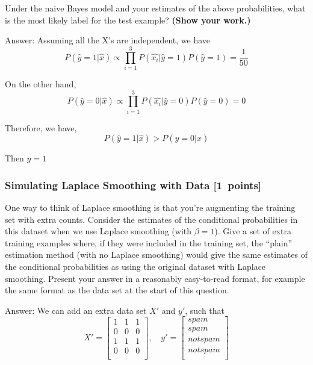 \documentclass{article}
\newcommand{\blu}[1]{{\textcolor{blu}{#1}}}
\newenvironment{answer}{\par\begingroup\color{gre}Answer: }{\endgroup}
\let\ask\blu
\newcommand\pts[1]{\textcolor{pointscolour}{[#1~points]}}
\begin{document}
    \ask{Under the naive Bayes model and your estimates of the above probabilities, what is the most likely label for the test example? \textbf{(Show your work.)}}
    \begin{answer}
        Assuming all the X's are independent, we have
        \begin{equation}
            P(\hat{y} = 1 | \hat{x}) \propto \prod_{i = 1}^3 P(\hat{x_{i}}| \hat{y} = 1) P(\hat{y} = 1) = \frac{1}{50}
        \end{equation}

        On the other hand,
        \begin{equation}
            P(\hat{y} = 0 | \hat{x})  \propto \prod_{i = 1}^3 P(\hat{x_{i}}| \hat{y} = 0) P(\hat{y} = 0)= 0
        \end{equation}

        Therefore, we have,
        \begin{equation}
            P(\hat{y} = 1 | \hat{x}) > P(\hat{y} = 0 | \hat{x})
        \end{equation}

        Then $\hat{y} = 1$
    \end{answer}

    \subsubsection{Simulating Laplace Smoothing with Data \pts{1}}
    \label{laplace.conceptual}

    One way to think of Laplace smoothing is that you're augmenting the training set with extra counts. Consider the estimates of the conditional probabilities in this dataset when we use Laplace smoothing (with $\beta = 1$).
    \ask{Give a set of extra training examples where, if they were included in the training set, the ``plain'' estimation method (with no Laplace smoothing) would give the same estimates of the conditional probabilities as using the original dataset with Laplace smoothing.}
    Present your answer in a reasonably easy-to-read format, for example the same format as the data set at the start of this question.

    \begin{answer}
        We can add an extra data set $X'$ and $y'$, such that 
        \[
            X' = \begin{bmatrix}
            1&1&1 \\
            0&0&0 \\
            1&1&1 \\
            0&0&0 \\
        \end{bmatrix}
        ,\quad
        y' = \begin{bmatrix}
            spam\\
            spam\\
            not spam\\
            not spam\\
        \end{bmatrix}
        \]
    \end{answer}
\end{document}
